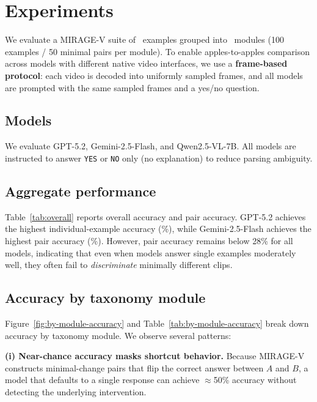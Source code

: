 \section{Experiments}
We evaluate a MIRAGE-V suite of \NumExamples\ examples grouped into \NumModules\ modules (100 examples / 50 minimal pairs per module).
To enable apples-to-apples comparison across models with different native video interfaces, we use a \textbf{frame-based protocol}: each video is decoded into \textbf{\FramesPerVideo} uniformly sampled frames, and all models are prompted with the same sampled frames and a yes/no question.

\subsection{Models}
We evaluate GPT-5.2, Gemini-2.5-Flash, and Qwen2.5-VL-7B.
All models are instructed to answer \texttt{YES} or \texttt{NO} only (no explanation) to reduce parsing ambiguity.

\subsection{Aggregate performance}
Table~\ref{tab:overall} reports overall accuracy and pair accuracy.
GPT-5.2 achieves the highest individual-example accuracy (\BestAcc\%), while Gemini-2.5-Flash achieves the highest pair accuracy (\BestPairAcc\%).
However, pair accuracy remains below 28\% for all models, indicating that even when models answer single examples moderately well, they often fail to \emph{discriminate} minimally different clips.

\begin{table}[t]
  \centering
  \small
  \caption{Overall results on \NumExamples\ examples (\FramesPerVideo uniform frames per video). We bold the best score in each column.}
  \label{tab:overall}
  
\end{table}

\subsection{Accuracy by taxonomy module}
Figure~\ref{fig:by-module-accuracy} and Table~\ref{tab:by-module-accuracy} break down accuracy by taxonomy module. We observe several patterns:

\textbf{(i) Near-chance accuracy masks shortcut behavior.}
Because MIRAGE-V constructs minimal-change pairs that flip the correct answer between $A$ and $B$, a model that defaults to a single response can achieve $\approx$50\% accuracy without detecting the underlying intervention.

